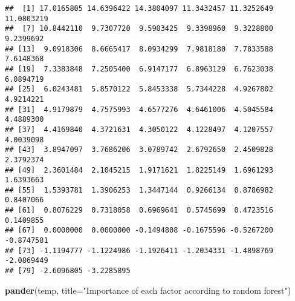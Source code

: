 \documentclass[]{article}
\newenvironment{Shaded}{\begin{snugshade}}{\end{snugshade}}
\newcommand{\KeywordTok}[1]{\textcolor[rgb]{0.13,0.29,0.53}{\textbf{{#1}}}}
\newcommand{\DataTypeTok}[1]{\textcolor[rgb]{0.13,0.29,0.53}{{#1}}}
\newcommand{\StringTok}[1]{\textcolor[rgb]{0.31,0.60,0.02}{{#1}}}
\newcommand{\OtherTok}[1]{\textcolor[rgb]{0.56,0.35,0.01}{{#1}}}
\newcommand{\NormalTok}[1]{{#1}}
\begin{document}
\begin{Shaded}
\end{Shaded}

\begin{verbatim}
##  [1] 17.0165805 14.6396422 14.3804097 11.3432457 11.3252649 11.0803219
##  [7] 10.8442110  9.7307720  9.5903425  9.3398960  9.3228800  9.2399692
## [13]  9.0918306  8.6665417  8.0934299  7.9818180  7.7833588  7.6148368
## [19]  7.3383848  7.2505400  6.9147177  6.8963129  6.7623038  6.0894719
## [25]  6.0243481  5.8570122  5.8453338  5.7344228  4.9267802  4.9214221
## [31]  4.9179879  4.7575993  4.6577276  4.6461006  4.5045584  4.4889300
## [37]  4.4169840  4.3721631  4.3050122  4.1228497  4.1207557  4.0039098
## [43]  3.8947097  3.7686206  3.0789742  2.6792650  2.4509828  2.3792374
## [49]  2.3601484  2.1045215  1.9171621  1.8225149  1.6961293  1.6393663
## [55]  1.5393781  1.3906253  1.3447144  0.9266134  0.8786982  0.8407066
## [61]  0.8076229  0.7318058  0.6969641  0.5745699  0.4723516  0.1409855
## [67]  0.0000000  0.0000000 -0.1494808 -0.1675596 -0.5267200 -0.8747581
## [73] -1.1194777 -1.1224986 -1.1926411 -1.2034331 -1.4898769 -2.0869449
## [79] -2.6096805 -3.2285895
\end{verbatim}

\begin{Shaded}
\begin{Highlighting}[]
\KeywordTok{pander}\NormalTok{(temp, }\DataTypeTok{title=}\StringTok{"Importance of each factor according to random forest"}\NormalTok{)}
\end{Highlighting}
\end{Shaded}
\end{document}
